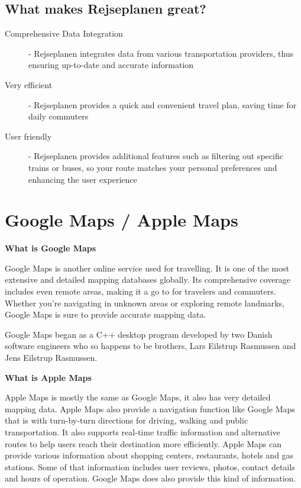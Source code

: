 \documentclass[11pt]{article}
\begin{document}
    \subsection{What makes Rejseplanen great?}\label{subsec:what-makes-rejseplanen-great?}
    \begin{description}
        \item [Comprehensive Data Integration] - Rejseplanen integrates data from various transportation providers, thus
        ensuring up-to-date and accurate information
        \item [Very efficient] - Rejseplanen provides a quick and convenient travel plan, saving time for daily
        commuters
        \item [User friendly] - Rejseplanen provides additional features such as filtering out specific trains or buses,
        so your route matches your personal preferences and enhancing the user experience
    \end{description}


    \section{Google Maps / Apple Maps}\label{sec:google-maps-/-apple-maps}

    \textbf{What is Google Maps}

    Google Maps is another online service used for travelling.
    It is one of the most extensive and detailed mapping databases globally.
    Its comprehensive coverage includes even remote areas, making it a go to for travelers and commuters.
    Whether you're navigating in unknown areas or exploring remote landmarks, Google Maps is sure to provide accurate
    mapping data.\cite{GoogleMaps} \newline

    Google Maps began as a C++ desktop program developed by two Danish software engineers who so happens to be brothers,
    Lars Eilstrup Rasmussen and Jens Eilstrup Rasmussen.\cite{GoogleMaps} \newline

    \textbf{What is Apple Maps}

    Apple Maps is mostly the same as Google Maps, it also has very detailed mapping data.
    Apple Maps also provide a navigation function like Google Maps that is with turn-by-turn directions for driving,
    walking and public transportation.
    It also supports real-time traffic information and alternative routes to help users reach their destination more
    efficiently.
    Apple Maps can provide various information about shopping centers, restaurants, hotels and gas stations.
    Some of that information includes user reviews, photos, contact details and hours of operation.
    Google Maps does also provide this kind of information. \newline
\end{document}
